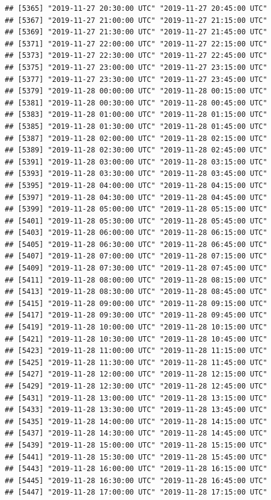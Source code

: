 \documentclass{article}\usepackage[]{graphicx}\usepackage[]{color}
\makeatletter
\newenvironment{kframe}{%
 \def\at@end@of@kframe{}%
 \ifinner\ifhmode%
  \def\at@end@of@kframe{\end{minipage}}%
  \begin{minipage}{\columnwidth}%
 \fi\fi%
 \def\FrameCommand##1{\hskip\@totalleftmargin \hskip-\fboxsep
 \colorbox{shadecolor}{##1}\hskip-\fboxsep
     \hskip-\linewidth \hskip-\@totalleftmargin \hskip\columnwidth}%
 \MakeFramed {\advance\hsize-\width
   \@totalleftmargin\z@ \linewidth\hsize
   \@setminipage}}%
 {\par\unskip\endMakeFramed%
 \at@end@of@kframe}
\newenvironment{knitrout}{}{} %
\makeatother
\begin{document}
\begin{knitrout}
\begin{kframe}
\begin{verbatim}
## [5365] "2019-11-27 20:30:00 UTC" "2019-11-27 20:45:00 UTC"
## [5367] "2019-11-27 21:00:00 UTC" "2019-11-27 21:15:00 UTC"
## [5369] "2019-11-27 21:30:00 UTC" "2019-11-27 21:45:00 UTC"
## [5371] "2019-11-27 22:00:00 UTC" "2019-11-27 22:15:00 UTC"
## [5373] "2019-11-27 22:30:00 UTC" "2019-11-27 22:45:00 UTC"
## [5375] "2019-11-27 23:00:00 UTC" "2019-11-27 23:15:00 UTC"
## [5377] "2019-11-27 23:30:00 UTC" "2019-11-27 23:45:00 UTC"
## [5379] "2019-11-28 00:00:00 UTC" "2019-11-28 00:15:00 UTC"
## [5381] "2019-11-28 00:30:00 UTC" "2019-11-28 00:45:00 UTC"
## [5383] "2019-11-28 01:00:00 UTC" "2019-11-28 01:15:00 UTC"
## [5385] "2019-11-28 01:30:00 UTC" "2019-11-28 01:45:00 UTC"
## [5387] "2019-11-28 02:00:00 UTC" "2019-11-28 02:15:00 UTC"
## [5389] "2019-11-28 02:30:00 UTC" "2019-11-28 02:45:00 UTC"
## [5391] "2019-11-28 03:00:00 UTC" "2019-11-28 03:15:00 UTC"
## [5393] "2019-11-28 03:30:00 UTC" "2019-11-28 03:45:00 UTC"
## [5395] "2019-11-28 04:00:00 UTC" "2019-11-28 04:15:00 UTC"
## [5397] "2019-11-28 04:30:00 UTC" "2019-11-28 04:45:00 UTC"
## [5399] "2019-11-28 05:00:00 UTC" "2019-11-28 05:15:00 UTC"
## [5401] "2019-11-28 05:30:00 UTC" "2019-11-28 05:45:00 UTC"
## [5403] "2019-11-28 06:00:00 UTC" "2019-11-28 06:15:00 UTC"
## [5405] "2019-11-28 06:30:00 UTC" "2019-11-28 06:45:00 UTC"
## [5407] "2019-11-28 07:00:00 UTC" "2019-11-28 07:15:00 UTC"
## [5409] "2019-11-28 07:30:00 UTC" "2019-11-28 07:45:00 UTC"
## [5411] "2019-11-28 08:00:00 UTC" "2019-11-28 08:15:00 UTC"
## [5413] "2019-11-28 08:30:00 UTC" "2019-11-28 08:45:00 UTC"
## [5415] "2019-11-28 09:00:00 UTC" "2019-11-28 09:15:00 UTC"
## [5417] "2019-11-28 09:30:00 UTC" "2019-11-28 09:45:00 UTC"
## [5419] "2019-11-28 10:00:00 UTC" "2019-11-28 10:15:00 UTC"
## [5421] "2019-11-28 10:30:00 UTC" "2019-11-28 10:45:00 UTC"
## [5423] "2019-11-28 11:00:00 UTC" "2019-11-28 11:15:00 UTC"
## [5425] "2019-11-28 11:30:00 UTC" "2019-11-28 11:45:00 UTC"
## [5427] "2019-11-28 12:00:00 UTC" "2019-11-28 12:15:00 UTC"
## [5429] "2019-11-28 12:30:00 UTC" "2019-11-28 12:45:00 UTC"
## [5431] "2019-11-28 13:00:00 UTC" "2019-11-28 13:15:00 UTC"
## [5433] "2019-11-28 13:30:00 UTC" "2019-11-28 13:45:00 UTC"
## [5435] "2019-11-28 14:00:00 UTC" "2019-11-28 14:15:00 UTC"
## [5437] "2019-11-28 14:30:00 UTC" "2019-11-28 14:45:00 UTC"
## [5439] "2019-11-28 15:00:00 UTC" "2019-11-28 15:15:00 UTC"
## [5441] "2019-11-28 15:30:00 UTC" "2019-11-28 15:45:00 UTC"
## [5443] "2019-11-28 16:00:00 UTC" "2019-11-28 16:15:00 UTC"
## [5445] "2019-11-28 16:30:00 UTC" "2019-11-28 16:45:00 UTC"
## [5447] "2019-11-28 17:00:00 UTC" "2019-11-28 17:15:00 UTC"

\end{verbatim}
\end{kframe}
\end{knitrout}
\end{document}
